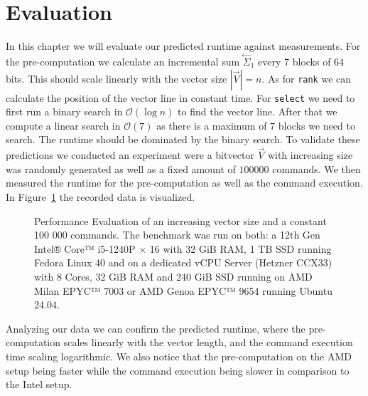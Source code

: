 \documentclass[a4paper,UKenglish,cleveref, autoref, thm-restate]{lipics-v2021}
\def\code#1{\texttt{#1}}
\newcommand\prevsum[0]{\ensuremath{\overset{\leftarrow}{\Sigma}_1}}
\begin{document}
\section{Evaluation}
In this chapter we will evaluate our predicted runtime against measurements.
For the pre-computation we calculate an incremental sum $\prevsum$ every 7 blocks of 64 bits.
This should scale linearly with the vector size $|\vec{V}|=n$.
As for \code{rank} we can calculate the position of the vector line in constant time.
For \code{select} we need to first run a binary search in $\mathcal{O}(\log{n})$ to find the vector line.
After that we compute a linear search in $\mathcal{O}(7)$ as there is a maximum of 7 blocks we need to search.
The runtime should be dominated by the binary search.
To validate these predictions we conducted an experiment were a bitvector $\vec{V}$ with increasing
size was randomly generated as well as a fixed amount of $100 000$ commands.
We then measured the runtime for the pre-computation as well as the command execution.
In Figure~\ref{fig:performance_eval} the recorded data is visualized.
\begin{figure}[htbp]
    \centering
    
    \caption{%
        Performance Evaluation of an increasing vector size and a constant 100 000 commands.
        The benchmark was run on both:
        a 12th Gen Intel® Core™ i5-1240P × 16 with 32 GiB RAM, 1 TB SSD running Fedora Linux 40
        and on a dedicated vCPU Server (Hetzner CCX33) with 
        8 Cores, 32 GiB RAM and 240 GiB SSD running on AMD Milan EPYC™ 7003 or AMD Genoa EPYC™ 9654
        running Ubuntu 24.04.
    }
    \label{fig:performance_eval}
\end{figure}
Analyzing our data we can confirm the predicted runtime, where the pre-computation scales linearly
with the vector length, and the command execution time scaling logarithmic.
We also notice that the pre-computation on the AMD setup being faster while the command execution being
slower in comparison to the Intel setup.



% 

\appendix
\end{document}
